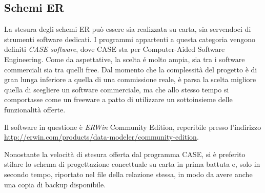 \documentclass[12pt,a4paper,onecolumn,x11names]{article}
\begin{document}
%			
		
\newpage


	\subsection{Schemi ER}
		\begin{flushleft}
			La stesura degli schemi ER può essere sia realizzata su carta, sia servendoci di strumenti software dedicati. I programmi appartenti a questa categoria vengono definiti \textit{CASE software}, dove CASE sta per Computer-Aided Software Engineering. Come da aspettative, la scelta \'{e} molto ampia, sia tra i software commerciali sia tra quelli free. Dal momento che la complessità del progetto è di gran lunga inferiore a quella di una commissione reale, è parsa la scelta migliore quella di scegliere un software commerciale, ma che allo stesso tempo si comportasse come un freeware a patto di utilizzare un sottoinsieme delle funzionalità offerte.\newline
			
			Il software in questione è \textit{ERWin} Community Edition, reperibile presso l'indirizzo \url{http://erwin.com/products/data-modeler/community-edition}.\newline
			
			Nonostante la velocità di stesura offerta dal programma CASE, si è preferito stilare lo schema di progettazione concettuale su carta in prima battuta e, solo in secondo tempo, riportato nel file della relazione stessa, in modo da avere anche una copia di backup disponibile.
		\end{flushleft}
\end{document}
